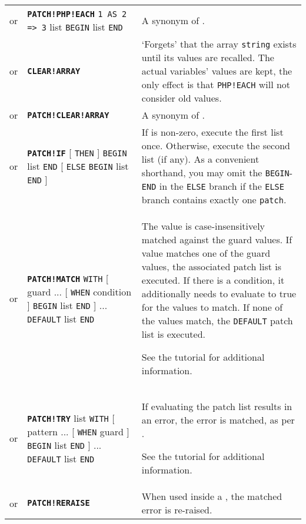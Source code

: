 \documentclass{article}
\def\ttref#1{\ahrefloc{#1}{\tt #1}}
\def\DEFINE#1{{\tt \bf #1}\label{#1}\index{#1}}
\def\t#1{{\tt #1}}
\def\Slist{{\color{red} list }}
\def\Ob{{\color{red} [ }}
\def\Oe{{\color{red} ] }}
\begin{document}
\begin{tabular}{cp{10in}|p{10in}}
or & \DEFINE{PATCH!PHP!EACH} \t{\ttref{String}1 AS \ttref{String}2 => \ttref{String}3} \Slist
                             \t{BEGIN} \ttref{patch} \Slist \t{END} &
    A synonym of \ttref{PHP!EACH}.
\\

or & \DEFINE{CLEAR!ARRAY} \ttref{String} &
    `Forgets' that the array \t{string} exists until its values are recalled.
    The actual variables' values are kept, the only effect is that \t{*PHP!EACH}
    will not consider old values.
\\

or & \DEFINE{PATCH!CLEAR!ARRAY} \ttref{String} &
    A synonym of \ttref{CLEAR!ARRAY}.
\\


or & \DEFINE{PATCH!IF} \ttref{value} \Ob \t{THEN} \Oe \t{BEGIN}
  \ttref{patch} \Slist \t{END}
  \Ob \t{ELSE} \t{BEGIN} \ttref{patch} \Slist \t{END} \Oe
  &
  If \ttref{value} is non-zero, execute the first \ttref{patch} \Slist
  once. Otherwise, execute the second \ttref{patch} \Slist (if any). As a
  convenient shorthand, you may omit the \t{BEGIN}-\t{END} in the \t{ELSE}
  branch if the \t{ELSE} branch contains exactly one \t{patch}.
  \\
  or & \DEFINE{PATCH!MATCH} \ttref{value} \t{WITH} \Ob guard\ttref{value} ...
    \Ob \t{WHEN} condition\ttref{value} \Oe
    \t{BEGIN} \ttref{patch} \Slist \t{END} \Oe
    ... \t{DEFAULT} \ttref{patch} \Slist \t{END} &
    The value is case-insensitively matched against the guard
    values. If value matches one of the guard values, the associated
    patch list is executed. If there is a condition, it additionally
    needs to evaluate to true for the values to match. If none
    of the values match, the \t{DEFAULT} patch list is executed.

    See the \ttref{MATCH and TRY} tutorial for additional information.
  \\
  or & \DEFINE{PATCH!TRY} \ttref{patch} \Slist \t{WITH} \Ob pattern\ttref{value} ...
    \Ob \t{WHEN} guard\ttref{value} \Oe
    \t{BEGIN} \ttref{patch} \Slist \t{END} \Oe
    ... \t{DEFAULT} \ttref{patch} \Slist \t{END} &
    If evaluating the patch list results in an error, the error is matched, as per \ttref{PATCH!MATCH}.

    See the \ttref{MATCH and TRY} tutorial for additional information.
  \\
  or & \DEFINE{PATCH!RERAISE} &
     When used inside a \ttref{PATCH!TRY}, the matched error is re-raised.


\end{tabular}
\end{document}
